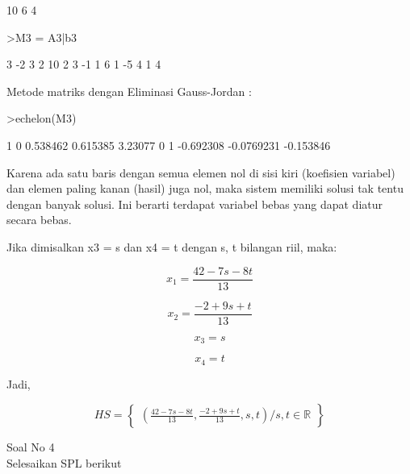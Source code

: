 \begin{eulernotebook}
\begin{eulercomment}
\begin{eulercomment}
\begin{eulercomment}
\begin{eulercomment}
\begin{euleroutput}
             10 
              6 
              4 
\end{euleroutput}
\begin{eulerprompt}
>M3 = A3|b3
\end{eulerprompt}
\begin{euleroutput}
              3            -2             3             2            10 
              2             3            -1             1             6 
              1            -5             4             1             4 
\end{euleroutput}
\begin{eulercomment}
Metode matriks dengan Eliminasi Gauss-Jordan :
\end{eulercomment}
\begin{eulerprompt}
>echelon(M3)
\end{eulerprompt}
\begin{euleroutput}
              1             0      0.538462      0.615385       3.23077 
              0             1     -0.692308    -0.0769231     -0.153846 
\end{euleroutput}
\begin{eulercomment}
Karena ada satu baris dengan semua elemen nol di sisi kiri (koefisien
variabel) dan elemen paling kanan (hasil) juga nol, maka sistem
memiliki solusi tak tentu dengan banyak solusi. Ini berarti terdapat
variabel bebas yang dapat diatur secara bebas.

Jika dimisalkan x3 = s dan x4 = t dengan s, t bilangan riil, maka:

\end{eulercomment}
\begin{eulerformula}
\[
x_{1} = \frac{42-7s-8t}{13}
\]
\end{eulerformula}
\begin{eulerformula}
\[
x_{2} = \frac{-2+9s+t}{13}
\]
\end{eulerformula}
\begin{eulerformula}
\[
x_{3} = s
\]
\end{eulerformula}
\begin{eulerformula}
\[
x_{4} = t
\]
\end{eulerformula}
\begin{eulercomment}
Jadi,\\
\end{eulercomment}
\begin{eulerformula}
\[
HS = \begin{Bmatrix}(\frac{42-7s-8t}{13}, \frac{-2+9s+t}{13}, s, t)/s,t \in \mathbb{R}\end{Bmatrix}
\]
\end{eulerformula}
\begin{eulercomment}
\end{eulercomment}
\eulersubheading{}
\begin{eulercomment}
Soal No 4\\
Selesaikan SPL berikut


\end{eulercomment}
\end{eulercomment}
\end{eulercomment}
\end{eulercomment}
\end{eulercomment}
\end{eulernotebook}
